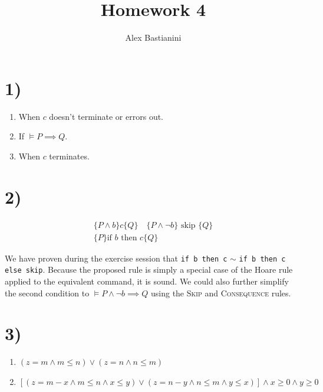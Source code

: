 \documentclass[11pt]{article}
\title{Homework 4}
\author{Alex Bastianini}
\date{}
\newcommand{\infrule}[2]{%
  \begin{array}{c}
    #1 \\ \hline #2
  \end{array}%
}
\begin{document}
\maketitle

\section*{1)}
\begin{enumerate}
\item When $ c $ doesn't terminate or errors out.
\item If $ \models P \implies Q $.
\item When $ c $ terminates.
\end{enumerate}

\section*{2)}
\[
\infrule{ \{P \land b\} c \{Q\}\quad \{P \land \lnot b\} \text{ skip } \{Q\}}{ \{P\} \text{if } b \text{ then } c \{Q\}}
\]

We have proven during the exercise session that \texttt{if b then c} $ \sim $ \texttt{if b then c else skip}. Because the proposed rule is simply a special case of the Hoare rule applied to the equivalent command, it is sound. We could also further simplify the second condition to $ \models P \land \lnot b \implies Q $ using the \textsc{Skip} and \textsc{Consequence} rules.

\section*{3)}
\begin{enumerate}
  \item $ (z = m \land m \leq n) \lor (z = n \land n \leq m) $
  \item $ [(z = m - x \land m \leq n \land x \leq y) \lor (z = n - y \land n \leq m \land y \leq x)] \land x \geq 0 \land y \geq 0 $
\end{enumerate}
\end{document}
